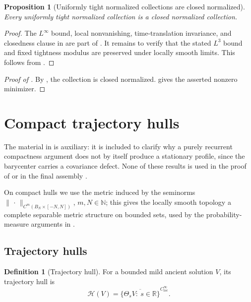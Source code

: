\documentclass[11pt]{amsart}
\theoremstyle{plain}
\newtheorem{proposition}[proposition]{Proposition}
\theoremstyle{definition}
\newtheorem{definition}[definition]{Definition}
\theoremstyle{remark}
\numberwithin{equation}{section}
\newcommand{\R}{\mathbb R}
\newcommand{\N}{\mathbb N}
\newcommand{\loc}{\mathrm{loc}}
\newcommand{\calH}{\mathcal H}
\begin{document}
\begin{proposition}[Uniformly tight normalized collections are closed normalized]
\label{p2:prop:tight-closed-normalized}
Every uniformly tight normalized collection is a closed normalized collection.
\end{proposition}

\begin{proof}
The \(L^\infty\) bound, local nonvanishing, time-translation invariance, and
closedness clause in  are part of
.  It remains to verify that the
stated \(L^3\) bound and fixed tightness modulus are
preserved under locally smooth limits.  This follows from
.
\end{proof}

\begin{proof}[Proof of ]
By , the collection is closed normalized.
 gives the asserted nonzero minimizer.
\end{proof}

\section{Compact trajectory hulls}
\label{p2:sec:compact-hulls}

The material in  is
auxiliary: it is included to clarify why a purely recurrent compactness
argument does not by itself produce a stationary profile, since the
barycenter carries a covariance defect.  None of these results is used in the
proof of  or in the final assembly
.

On compact hulls we use the metric induced by the seminorms
\(\|\,\cdot\,\|_{C^m(B_N\times[-N,N])}\), \(m,N\in\N\); this gives the
locally smooth topology a complete separable metric structure on bounded
sets, used by the probability-measure arguments in
.

\subsection{Trajectory hulls}

\begin{definition}[Trajectory hull]\label{p2:def:trajectory-hull}
For a bounded mild ancient solution \(V\), its trajectory hull is
\[
   \calH(V)
   =
   \overline{\{\Theta_sV:\ s\in\R\}}^{C^\infty_{\loc}}.
\]
\end{definition}
\end{document}
